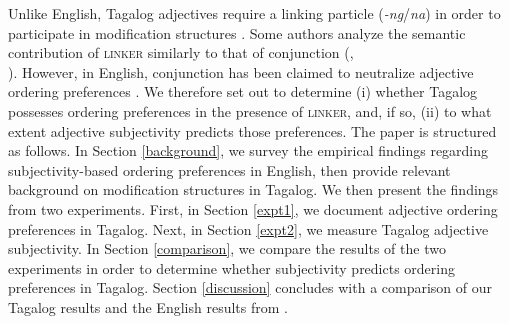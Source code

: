 \documentclass[12pt,letterpaper]{article}
\begin{document}
Unlike English, Tagalog adjectives require a linking particle (\emph{-ng}/\emph{na}) in order to participate in modification structures \citep{foley1975,rubin1994,kaufman2009}. Some authors analyze the semantic contribution of \textsc{linker} similarly to that of conjunction (\citealp{rubin1994},\\ \noindent\citealp{scontrasnicolae2014}). However, in English, conjunction has been claimed to neutralize adjective ordering preferences \citep{fordolson1975,byrne1979}. We therefore set out to determine (i) whether Tagalog possesses ordering preferences in the presence of \textsc{linker}, and, if so, (ii) to what extent adjective subjectivity predicts those preferences. The paper is structured as follows. In Section \ref{background}, we survey the empirical findings regarding subjectivity-based ordering preferences in English, then provide relevant background on modification structures in Tagalog. We then present the findings from two experiments. First, in Section \ref{expt1}, we document adjective ordering preferences in Tagalog. Next, in Section \ref{expt2}, we measure Tagalog adjective subjectivity. In Section \ref{comparison}, we compare the results of the two experiments in order to determine whether subjectivity predicts ordering preferences in Tagalog. Section \ref{discussion} concludes with a comparison of our Tagalog results and the English results from \cite{scontrasetal2017adjectives}.

\end{document}
